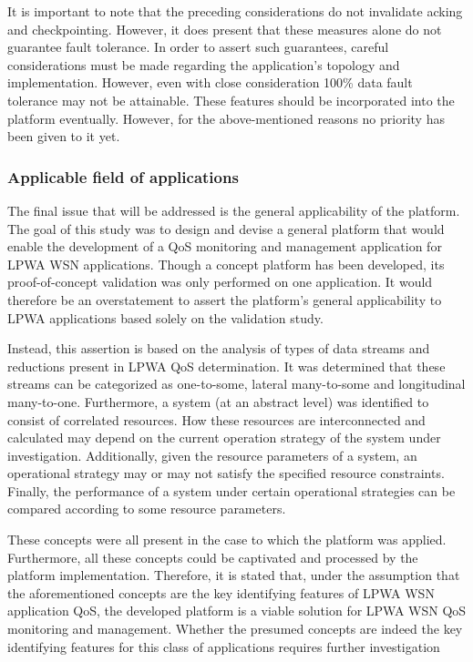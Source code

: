 It is important to note that the preceding considerations do not invalidate acking and checkpointing. However, it does present that these measures alone do not guarantee fault tolerance. In order to assert such guarantees, careful considerations must be made regarding the application's topology and implementation. However, even with close consideration 100\% data fault tolerance may not be attainable. These features should be incorporated into the platform eventually. However, for the above-mentioned reasons no priority has been given to it yet.

\subsubsection{Applicable field of applications}
The final issue that will be addressed is the general applicability of the platform. The goal of this study was to design and devise a general platform that would enable the development of a QoS monitoring and management application for LPWA WSN applications. Though a concept platform has been developed, its proof-of-concept validation was only performed on one application. It would therefore be an overstatement to assert the platform's general applicability to LPWA applications based solely on the validation study.

Instead, this assertion is based on the analysis of types of data streams and reductions present in LPWA QoS determination. It was determined that these streams can be categorized as one-to-some, lateral many-to-some and longitudinal many-to-one. Furthermore, a system (at an abstract level) was identified to consist of correlated resources. How these resources are interconnected and calculated may depend on the current operation strategy of the system under investigation. Additionally, given the resource parameters of a system, an operational strategy may or may not satisfy the specified resource constraints. Finally, the performance of a system under certain operational strategies can be compared according to some resource parameters.

These concepts were all present in the case to which the platform was applied. Furthermore, all these concepts could be captivated and processed by the platform implementation. Therefore, it is stated  that, under the assumption that the aforementioned concepts are the key identifying features of LPWA WSN application QoS, the developed platform is a viable solution for LPWA WSN QoS monitoring and management. Whether the presumed concepts are indeed the key identifying features for this class of applications requires further investigation

